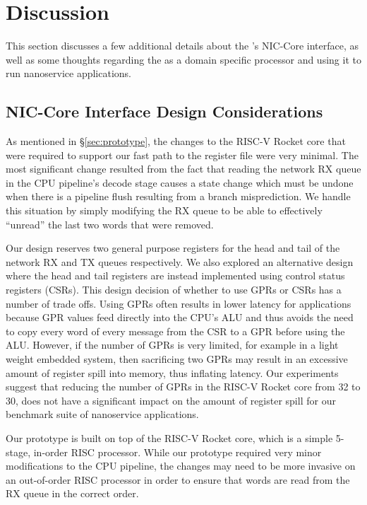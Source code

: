 \section{Discussion}
This section discusses a few additional details about the \name{}'s NIC-Core interface, as well as some thoughts regarding the \name{} as a domain specific processor and using it to run nanoservice applications.

\subsection{\name{} NIC-Core Interface Design Considerations}
As mentioned in \S\ref{sec:prototype}, the changes to the RISC-V Rocket core that were required to support our fast path to the register file were very minimal.
The most significant change resulted from the fact that reading the network RX queue in the CPU pipeline's decode stage causes a state change which must be undone when there is a pipeline flush resulting from a branch misprediction.
We handle this situation by simply modifying the RX queue to be able to effectively ``unread'' the last two words that were removed.

Our \name{} design reserves two general purpose registers for the head and tail of the network RX and TX queues respectively.
We also explored an alternative design where the head and tail registers are instead implemented using control status registers (CSRs).
This design decision of whether to use GPRs or CSRs has a number of trade offs.
Using GPRs often results in lower latency for applications because GPR values feed directly into the CPU's ALU and thus avoids the need to copy every word of every message from the CSR to a GPR before using the ALU.
However, if the number of GPRs is very limited, for example in a light weight embedded system, then sacrificing two GPRs may result in an excessive amount of register spill into memory, thus inflating latency.
Our experiments suggest that reducing the number of GPRs in the RISC-V Rocket core from 32 to 30, does not have a significant impact on the amount of register spill for our benchmark suite of nanoservice applications.

Our \name{} prototype is built on top of the RISC-V Rocket core, which is a simple 5-stage, in-order RISC processor.
While our prototype required very minor modifications to the CPU pipeline, the changes may need to be more invasive on an out-of-order RISC processor in order to ensure that words are read from the RX queue in the correct order.

